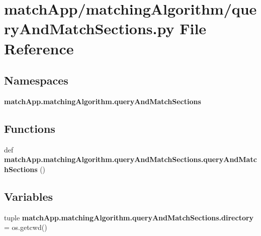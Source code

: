\section{match\+App/matching\+Algorithm/query\+And\+Match\+Sections.py File Reference}
\label{query_and_match_sections_8py}
\subsection*{Namespaces}
\begin{DoxyCompactItemize}
\item 
 {\bf match\+App.\+matching\+Algorithm.\+query\+And\+Match\+Sections}
\end{DoxyCompactItemize}
\subsection*{Functions}
\begin{DoxyCompactItemize}
\item 
def {\bf match\+App.\+matching\+Algorithm.\+query\+And\+Match\+Sections.\+query\+And\+Match\+Sections} ()
\end{DoxyCompactItemize}
\subsection*{Variables}
\begin{DoxyCompactItemize}
\item 
tuple {\bf match\+App.\+matching\+Algorithm.\+query\+And\+Match\+Sections.\+directory} = os.\+getcwd()
\end{DoxyCompactItemize}
